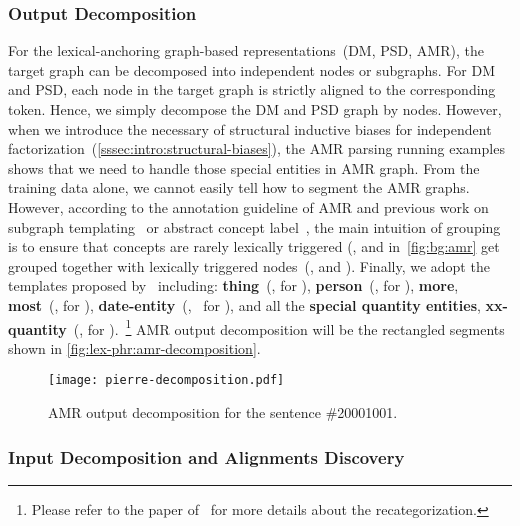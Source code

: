 \subsubsection{Output Decomposition}
\label{sssec:lex-phr:lex-output-decomposition}
For the lexical-anchoring graph-based representations~(DM, PSD, AMR),
the target graph can be decomposed into independent nodes or
subgraphs. For DM and PSD, each node in the target graph is strictly
aligned to the corresponding token. Hence, we simply decompose the DM
and PSD graph by nodes. However, when we introduce the necessary of
structural inductive biases for independent
factorization~(\autoref{sssec:intro:structural-biases}), the AMR
parsing running examples shows that we need to handle those special
entities in AMR graph.  From the training data alone, we cannot easily
tell how to segment the AMR graphs. However, according to the
annotation guideline of AMR and previous work on subgraph
templating~\cite{Werling:2015up} or abstract concept
label~\cite{Wang:2017vt}, the main intuition of grouping is to ensure
that concepts are rarely lexically triggered (\eg, 
and  in~\autoref{fig:bg:amr} get grouped
together with lexically triggered nodes~(\eg,  and ). Finally, we adopt the templates
proposed by~\citet{lyu2018amr} including: \textbf{thing}~(\eg,
 for ),
\textbf{person}~(\eg,  for
), \textbf{more}, \textbf{most}~(\eg,
 for
), \textbf{date-entity}~(\eg,~ for ), and all the \textbf{special quantity
entities}, \textbf{xx-quantity}~(\eg,  for ).~\footnote{Please refer
  to the paper of~\citet{lyu2018amr} for more details about the
  recategorization.} AMR output decomposition will be the rectangled segments shown in
\autoref{fig:lex-phr:amr-decomposition}.
\begin{figure}[!tbp]
  \begin{center}
  \texttt{[image: pierre-decomposition.pdf]}
  \end{center}
  \caption{\label{fig:lex-phr:amr-decomposition} AMR output
    decomposition for the sentence \#20001001.}
\end{figure}

\subsubsection{Input Decomposition and Alignments Discovery}
\label{sssec:lex-phr:lex-input-decomposition}

